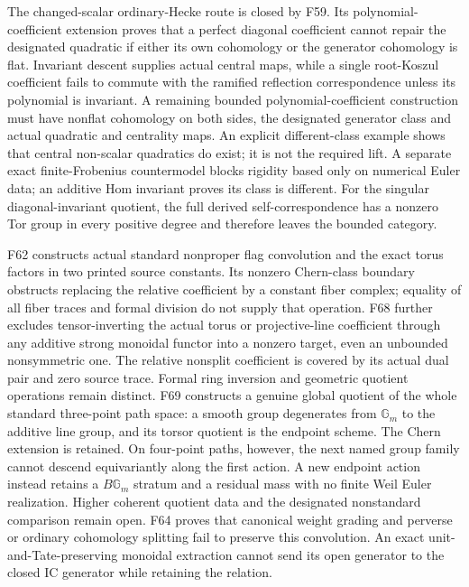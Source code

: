 \documentclass[11pt,a4paper]{article}
\theoremstyle{named}\newtheorem{finding}{Finding}[section]
\theoremstyle{definition}\newtheorem{definition}[finding]{Definition}
\theoremstyle{remark}\newtheorem{remark}[finding]{Remark}
\begin{document}
The changed-scalar ordinary-Hecke route is closed by F59. Its polynomial-coefficient extension proves that a perfect diagonal coefficient cannot repair the designated quadratic if either its own cohomology or the generator cohomology is flat. Invariant descent supplies actual central maps, while a single root-Koszul coefficient fails to commute with the ramified reflection correspondence unless its polynomial is invariant. A remaining bounded polynomial-coefficient construction must have nonflat cohomology on both sides, the designated generator class and actual quadratic and centrality maps. An explicit different-class example shows that central non-scalar quadratics do exist; it is not the required lift. A separate exact finite-Frobenius countermodel blocks rigidity based only on numerical Euler data; an additive Hom invariant proves its class is different. For the singular diagonal-invariant quotient, the full derived self-correspondence has a nonzero Tor group in every positive degree and therefore leaves the bounded category.

F62 constructs actual standard nonproper flag convolution and the exact torus factors in two printed source constants. Its nonzero Chern-class boundary obstructs replacing the relative coefficient by a constant fiber complex; equality of all fiber traces and formal division do not supply that operation. F68 further excludes tensor-inverting the actual torus or projective-line coefficient through any additive strong monoidal functor into a nonzero target, even an unbounded nonsymmetric one. The relative nonsplit coefficient is covered by its actual dual pair and zero source trace. Formal ring inversion and geometric quotient operations remain distinct. F69 constructs a genuine global quotient of the whole standard three-point path space: a smooth group degenerates from $\mathbb G_m$ to the additive line group, and its torsor quotient is the endpoint scheme. The Chern extension is retained. On four-point paths, however, the next named group family cannot descend equivariantly along the first action. A new endpoint action instead retains a $B\mathbb G_m$ stratum and a residual mass with no finite Weil Euler realization. Higher coherent quotient data and the designated nonstandard comparison remain open. F64 proves that canonical weight grading and perverse or ordinary cohomology splitting fail to preserve this convolution. An exact unit-and-Tate-preserving monoidal extraction cannot send its open generator to the closed IC generator while retaining the relation.
\end{document}
